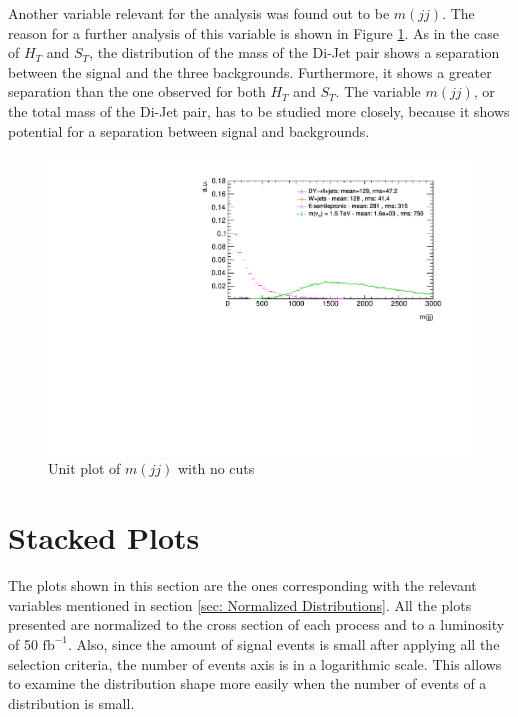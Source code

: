 Another variable relevant for the analysis was found out to be $m(jj)$. The reason for a further analysis of this variable is shown in Figure \ref{fig: mjjUnitNC}. As in the case of $H_{T}$ and $S_{T}$, the distribution of the mass of the Di-Jet pair shows a separation between the signal and the three backgrounds. Furthermore, it shows a greater separation than the one observed for both $H_{T}$ and $S_{T}$. The variable $m(jj)$, or the total mass of the Di-Jet pair, has to be studied more closely, because it shows potential for a separation between signal and backgrounds.

\begin{figure}
\centering
\includegraphics[width=\linewidth]{Plots/mjj_unitNC.pdf}
\caption{Unit plot of $m(jj)$ with no cuts}
\label{fig: mjjUnitNC}
\end{figure}


\section{Stacked Plots}\label{section: stackPlots}


The plots shown in this section are the ones corresponding with the relevant variables mentioned in section \ref{sec: Normalized Distributions}. All the plots presented are normalized to the cross section of each process and to a luminosity of 50 $\text{fb}^{-1}$. Also, since the amount of signal events is small after applying all the selection criteria, the number of events axis is in a logarithmic scale. This allows to examine the distribution shape more easily when the number of events of a distribution is small. 

